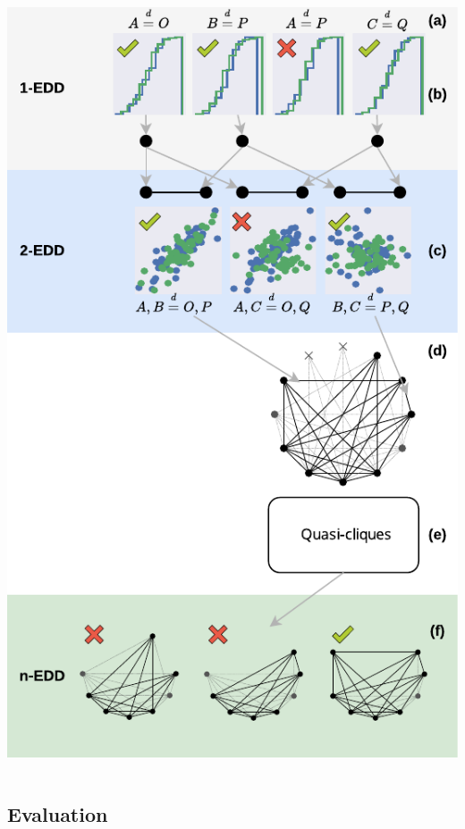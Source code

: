\documentclass[10pt,compress]{beamer}
\begin{document}
\begin{frame}{}
\begin{columns}
\begin{column}{.5\linewidth}
        \includegraphics[width=0.9\linewidth]{pipeline}
    \end{column}
    \end{columns}
\end{frame}

\subsection{Evaluation}
\end{document}
